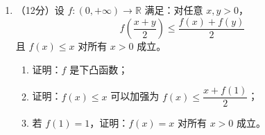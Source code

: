 \documentclass[12pt, a4paper]{ctexart}
\begin{document}
\begin{enumerate}[resume]
\item （12分）设 $f: (0, +\infty) \to \mathbb{R}$ 满足：对任意 $x, y > 0$，
$$f\left(\frac{x+y}{2}\right) \leqslant \frac{f(x) + f(y)}{2}$$
且 $f(x) \leqslant x$ 对所有 $x > 0$ 成立。
\begin{enumerate}[label=(\arabic*)]
\item 证明：$f$ 是下凸函数；
\item 证明：$f(x) \leqslant x$ 可以加强为 $f(x) \leqslant \dfrac{x+f(1)}{2}$；
\item 若 $f(1) = 1$，证明：$f(x) = x$ 对所有 $x > 0$ 成立。
\end{enumerate}

\end{enumerate}
\end{document}
